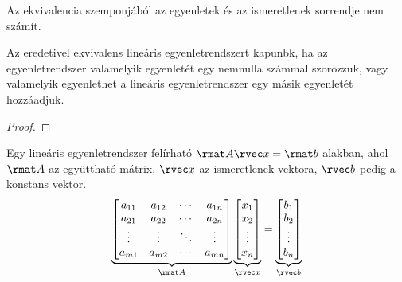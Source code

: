 \begin{note}
  Az ekvivalencia szemponjából az egyenletek és az ismeretlenek sorrendje nem
  számít.
\end{note}

\begin{statement}
  Az eredetivel ekvivalens lineáris egyenletrendszert kapunbk, ha az
  egyenletrendszer valamelyik egyenletét egy nemnulla számmal szorozzuk, vagy
  valamelyik egyenlethet a lineáris egyenletrendszer egy másik egyenletét
  hozzáadjuk.

  \begin{proof}
    \vspace{10em}
  \end{proof}
\end{statement}

\clearpage
\begin{blueBox}

  Egy lineáris egyenletrendszer felírható $\rmat A \rvec x = \rmat b$
  alakban, ahol $\rmat A$ az együttható mátrix, $\rvec x$ az ismeretlenek
  vektora, $\rvec b$ pedig a konstans vektor.
  $$
    \underbrace{\begin{bmatrix}
        a_{11} & a_{12} & \cdots & a_{1n} \\
        a_{21} & a_{22} & \cdots & a_{2n} \\
        \vdots & \vdots & \ddots & \vdots \\
        a_{m1} & a_{m2} & \cdots & a_{mn}
      \end{bmatrix}}_{\rmat A} \underbrace{\begin{bmatrix}
        x_{1} \\ x_{2} \\ \vdots \\ x_{n}
      \end{bmatrix}}_{\rvec x} = \underbrace{\begin{bmatrix}
        b_{1} \\ b_{2} \\ \vdots \\ b_{n}
      \end{bmatrix}}_{\rvec b}
  $$
\end{blueBox}

